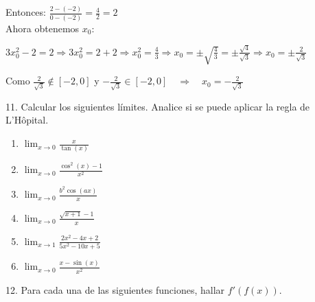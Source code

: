 \documentclass[12pt]{article}
\begin{document}
\begin{enumerate}[\hspace{9px} a)]
        Entonces: \quad \(\displaystyle\frac{2-(-2)}{0-(-2)}=\frac{4}{2}=2\)\\

        Ahora obtenemos $x_0$:

         \qquad \(3x_0^2-2=2 \Rightarrow 3x_0^2=2+2 \Rightarrow x_0^2=\displaystyle\frac{4}{3} \Rightarrow x_0=\pm\sqrt{\frac{4}{3}}=\pm\frac{\sqrt{4}}{\sqrt{3}} \Rightarrow x_0=\pm\frac{2}{\sqrt{3}}\)

          Como \(\displaystyle\frac{2}{\sqrt{3}} \notin [-2,0]\)  y  \(-\displaystyle\frac{2}{\sqrt{3}} \in [-2,0] \quad \Longrightarrow \quad x_0=-\displaystyle\frac{2}{\sqrt{3}}\)

\end{enumerate}

11. Calcular los siguientes l\'imites. Analice si se puede aplicar la regla de L'H\^opital.

\begin{enumerate}[\hspace{9px} a)]
    \item \(\displaystyle\lim_{x \to 0}\frac{x}{\tan(x)}\)
    \item \(\displaystyle\lim_{x \to 0}\frac{\cos^2(x)-1}{x^2}\)
    \item \(\displaystyle\lim_{x \to 0}\frac{b^2\cos(ax)}{x}\)
    \item \(\displaystyle\lim_{x \to 0}\frac{\sqrt{x+1}-1}{x}\)
    \item \(\displaystyle\lim_{x \to 1}\frac{2x^2-4x+2}{5x^2-10x+5}\)
    \item \(\displaystyle\lim_{x \to 0}\frac{x-\sin(x)}{x^2}\)
\end{enumerate}

12. Para cada una de las siguientes funciones, hallar $f'(f(x))$.
\end{document}
